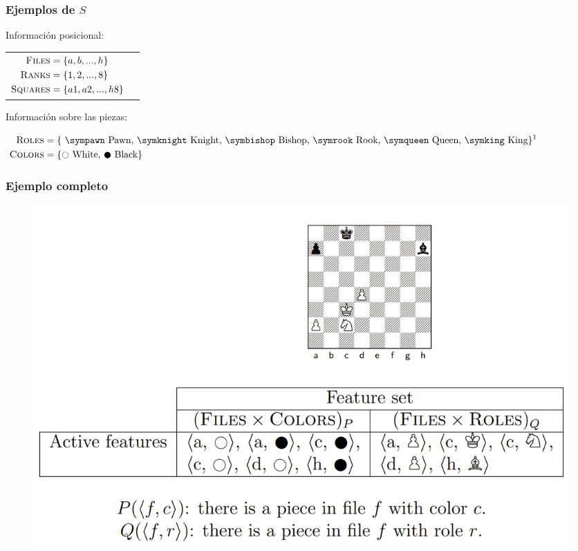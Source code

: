 \begin{frame}
\frametitle{Ejemplos de $S$}
Información posicional:

\begin{center}
\begin{tabular}{cc}

$\begin{aligned}[t]
\textsc{Files} &= \{a, b, ..., h\} \\
\textsc{Ranks} &= \{1, 2, ..., 8\} \\
\textsc{Squares} &= \{a1, a2, ..., h8\}
\end{aligned}$

&

\raisebox{-10ex}{
\chessboard[
    clearboard,
    tinyboard,
    showmover=false,
    pgfstyle={text},
    text=\fontsize{1.2ex}{1.2ex}\bfseries\sffamily \currentwq,
    markboard
]
}

\end{tabular}
\end{center}

Información sobre las piezas:

\begin{center}
$\begin{aligned}[t]
\featureset{Roles} &= \text{\{
    \sympawn\ Pawn,
    \symknight\ Knight,
    \symbishop\ Bishop,
    \symrook\ Rook,
    \symqueen\ Queen,
    \symking\ King\}}\textsuperscript{1} \\
\featureset{Colors} &= \text{\{\white\ White, \black\ Black\}}
\end{aligned}$
\end{center}


\end{frame}


\begin{frame}
\frametitle{Ejemplo completo}
\begin{figure}
\centering
\includegraphics[width=1.0\linewidth]{../assets/slides/fs.png}
\end{figure}
\end{frame}

